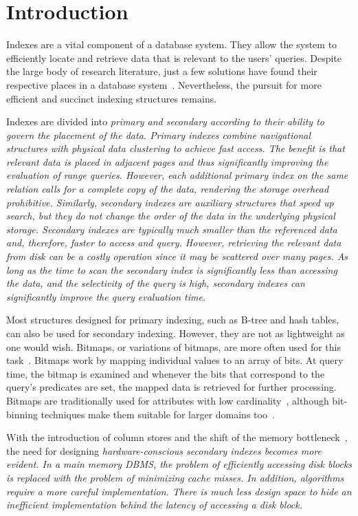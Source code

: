 \section{Introduction}\label{sec:intro}

Indexes are a vital component of a database system. They allow the system
to efficiently locate and retrieve data that is relevant to the users' queries. Despite the large body of research literature, just a few solutions have found
their respective places in a database system~\cite{BKS+90,HNP95,IKM07,OQ97}.
Nevertheless, the pursuit for more efficient and succinct indexing structures
remains.

Indexes are divided into \it{primary} and \it{secondary} according to their
ability to govern the placement of the data. Primary indexes combine
navigational structures with physical data clustering to achieve fast access.
The benefit is that relevant data is placed in adjacent pages and thus
significantly improving the evaluation of range queries. However, each
additional primary index on the same relation calls for a complete copy of the
data, rendering the storage overhead prohibitive. Similarly, secondary indexes
are auxiliary structures that speed up search, but they do not change the order
of the data in the underlying physical storage. Secondary indexes are typically
much smaller than the referenced data and, therefore, faster to access and
query. However, retrieving the relevant data from disk can be a costly
operation since it may be scattered over many pages. As long as the time to
scan the secondary index is significantly less than accessing the data, and the
selectivity of the query is high, secondary indexes can significantly improve
the query evaluation time.

Most structures designed for primary indexing, such as B-tree and hash tables,
can also be used for secondary indexing. However, they are not as lightweight
as one would wish. Bitmaps, or variations of bitmaps, are more often used for
this task~\cite{WLO+85}. Bitmaps work by mapping individual values to an array
of bits. At query time, the bitmap is examined and whenever the bits that
correspond to the query's predicates are set, the mapped data is retrieved for
further processing. Bitmaps are traditionally used for attributes with low
cardinality~\cite{ON87}, although bit-binning techniques make them suitable
for larger domains too~\cite{CI99,SW07}.

With the introduction of column stores and the shift of the memory
bottleneck~\cite{MKB09}, the need for designing \it{hardware-conscious}
secondary indexes becomes more evident. In a main memory DBMS, the problem
of efficiently accessing disk blocks is replaced with the problem of
minimizing cache misses. In addition, algorithms require a more
careful implementation. There is much less design space to hide an inefficient
implementation behind the latency of accessing a disk block.

